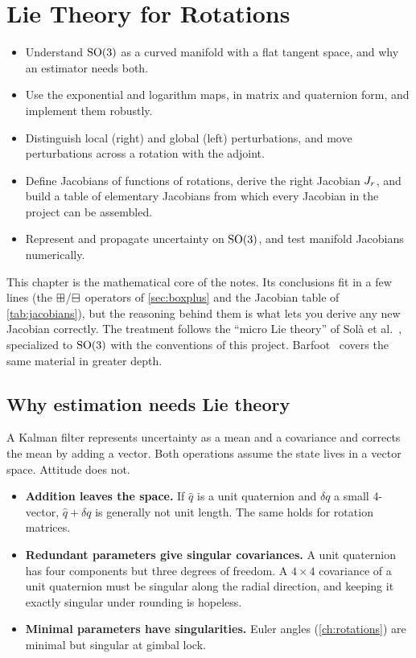 \chapter{Lie Theory for Rotations}
\label{ch:lie}

\begin{objectives}
\begin{itemize}
  \item Understand $\mathrm{SO}(3)$ as a curved manifold with a flat tangent space, and why an estimator needs both.
  \item Use the exponential and logarithm maps, in matrix and quaternion form, and implement them robustly.
  \item Distinguish local (right) and global (left) perturbations, and move perturbations across a
        rotation with the adjoint.
  \item Define Jacobians of functions of rotations, derive the right Jacobian $J_r$, and build a table
        of elementary Jacobians from which every Jacobian in the project can be assembled.
  \item Represent and propagate uncertainty on $\mathrm{SO}(3)$, and test manifold Jacobians numerically.
\end{itemize}
\end{objectives}

This chapter is the mathematical core of the notes. Its conclusions fit in a few lines (the
$\boxplus$/$\boxminus$ operators of \cref{sec:boxplus} and the Jacobian table of \cref{tab:jacobians}),
but the reasoning behind them is what lets you derive any new Jacobian correctly. The treatment
follows the ``micro Lie theory'' of Solà et al.~\cite{sola2018micro}, specialized to $\mathrm{SO}(3)$ with the
conventions of this project. Barfoot~\cite{barfoot2017state} covers the same material in greater depth.

\section{Why estimation needs Lie theory}

A Kalman filter represents uncertainty as a mean and a covariance and corrects the mean by adding
a vector. Both operations assume the state lives in a vector space. Attitude does not.
\begin{itemize}
  \item \textbf{Addition leaves the space.} If $\hat q$ is a unit quaternion and $\delta q$ a small
        4-vector, $\hat q + \delta q$ is generally not unit length. The same holds for rotation matrices.
  \item \textbf{Redundant parameters give singular covariances.} A unit quaternion has four
        components but three degrees of freedom. A $4\times4$ covariance of a unit quaternion must be
        singular along the radial direction, and keeping it exactly singular under rounding is hopeless.
  \item \textbf{Minimal parameters have singularities.} Euler angles (\cref{ch:rotations}) are minimal
        but singular at gimbal lock.
\end{itemize}

